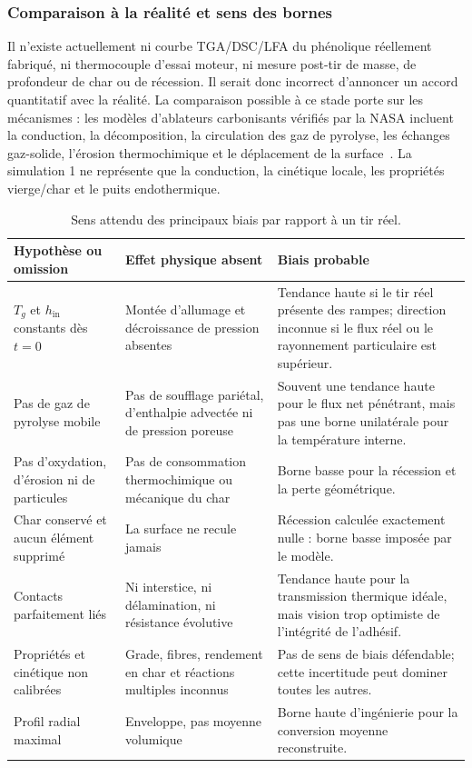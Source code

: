 \documentclass[oneside,openany]{amsdtx}
\begin{document}
\subsubsection{Comparaison à la réalité et sens des bornes}

Il n'existe actuellement ni courbe TGA/DSC/LFA du phénolique réellement
fabriqué, ni thermocouple d'essai moteur, ni mesure post-tir de masse, de
profondeur de char ou de récession. Il serait donc incorrect d'annoncer un
accord quantitatif avec la réalité. La comparaison possible à ce stade porte
sur les mécanismes : les modèles d'ablateurs carbonisants vérifiés par la NASA
incluent la conduction, la décomposition, la circulation des gaz de pyrolyse,
les échanges gaz-solide, l'érosion thermochimique et le déplacement de la
surface~\cite{ewing2013,amar2010,amar2016}. La simulation 1 ne représente que
la conduction, la cinétique locale, les propriétés vierge/char et le puits
endothermique.

\begin{table}[H]
\centering
\footnotesize
\renewcommand{\arraystretch}{1.18}
\begin{tabular}{L{0.25\textwidth}L{0.34\textwidth}L{0.31\textwidth}}
\toprule
\textbf{Hypothèse ou omission} & \textbf{Effet physique absent} &
\textbf{Biais probable} \\
\midrule
\(T_g\) et \(h_\mathrm{in}\) constants dès \(t=0\) &
Montée d'allumage et décroissance de pression absentes &
Tendance haute si le tir réel présente des rampes; direction inconnue si le
flux réel ou le rayonnement particulaire est supérieur. \\
Pas de gaz de pyrolyse mobile &
Pas de soufflage pariétal, d'enthalpie advectée ni de pression poreuse &
Souvent une tendance haute pour le flux net pénétrant, mais pas une borne
unilatérale pour la température interne. \\
Pas d'oxydation, d'érosion ni de particules &
Pas de consommation thermochimique ou mécanique du char &
Borne basse pour la récession et la perte géométrique. \\
Char conservé et aucun élément supprimé &
La surface ne recule jamais &
Récession calculée exactement nulle : borne basse imposée par le modèle. \\
Contacts parfaitement liés &
Ni interstice, ni délamination, ni résistance évolutive &
Tendance haute pour la transmission thermique idéale, mais vision trop
optimiste de l'intégrité de l'adhésif. \\
Propriétés et cinétique non calibrées &
Grade, fibres, rendement en char et réactions multiples inconnus &
Pas de sens de biais défendable; cette incertitude peut dominer toutes les
autres. \\
Profil radial maximal &
Enveloppe, pas moyenne volumique &
Borne haute d'ingénierie pour la conversion moyenne reconstruite. \\
\bottomrule
\end{tabular}~\\[1em]
\caption{Sens attendu des principaux biais par rapport à un tir réel.}
\label{tab:sim1-reality-bounds}
\end{table}
\end{document}
